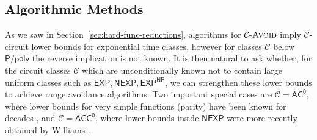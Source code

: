 \documentclass[11pt]{article}
\newtheorem{theorem}{Theorem}
\newtheorem{lemma}{Lemma}
\newcommand{\todo}[1]{\textcolor{red}{TODO: #1}}
\newcommand{\dash}{\text{-}}
\newcommand{\B}{\{0,1\}}
\newcommand{\avoid}{\textsc{Avoid}}
\begin{document}
%
\subsection{Algorithmic Methods}\label{sec:algorithmic-method}


As we saw in Section~\ref{sec:hard-func-reductions}, algorithms for $\mathcal{C}\dash \avoid$ imply $\mathcal{C}$-circuit lower bounds for exponential time classes, however for classes $\mathcal{C}$ below $\mathsf{P/poly}$ the reverse implication is not known. It is then natural to ask whether, for the circuit classes $\mathcal{C}$ which are unconditionally known not to contain large uniform classes such as $\mathsf{EXP}, \mathsf{NEXP}, \mathsf{EXP^{NP}}$, we can strengthen these lower bounds to achieve range avoidance algorithms. Two important special cases are $\mathcal{C} = \mathsf{AC^0}$, where lower bounds for very simple functions (parity) have been known for decades \cite{FSS,Ajtai83}, and $\mathcal{C}=\mathsf{ACC^0}$, where lower bounds inside $\mathsf{NEXP}$ were more recently obtained by Williams \cite{ryan-sat}. 
\end{document}
